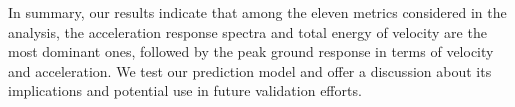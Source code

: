In summary, our results indicate that among the eleven metrics considered in the analysis, the acceleration response spectra and total energy of velocity are the most dominant ones, followed by the peak ground response in terms of velocity and acceleration. We test our prediction model and offer a discussion about its implications and potential use in future validation efforts.

%
% 


